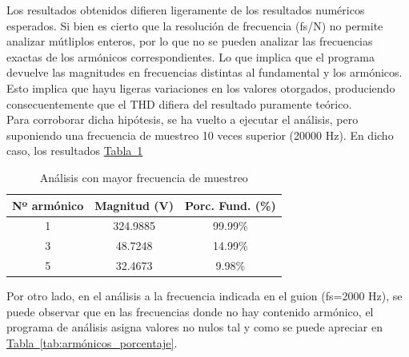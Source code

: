\documentclass{article}
\begin{document}
Los resultados obtenidos difieren ligeramente de los resultados numéricos esperados. Si bien es cierto que la resolución de frecuencia (fs/N) no permite analizar mútliplos enteros, por lo que no se pueden analizar las frecuencias exactas de los armónicos correspondientes. Lo que implica que el programa devuelve las magnitudes en frecuencias distintas al fundamental y los armónicos. Esto implica que hayu ligeras variaciones en los valores otorgados, produciendo consecuentemente que el THD difiera del resultado puramente teórico. 
\\

Para corroborar dicha hipótesis, se ha vuelto a ejecutar el análisis, pero suponiendo una frecuencia de muestreo 10 veces superior (20000 Hz). En dicho caso, los resultados \hyperref[tab:mag_harm_fs]{Tabla~\ref*{tab:mag_harm_fs}}
\\

\begin{table}[h!]
\centering
\begin{tabular}{c c c}  %
\hline
Nº armónico & Magnitud (V) & Porc. Fund. (\%) \\  %
\hline
1 & 324.9885 & 99.99\% \\
3 & 48.7248 & 14.99\% \\
5 & 32.4673 & 9.98\% \\
\hline
\end{tabular}
\caption{Análisis con mayor frecuencia de muestreo}
\label{tab:mag_harm_fs}
\end{table}

Por otro lado, en el análisis a la frecuencia indicada en el guion (fs=2000 Hz), se puede observar que en las frecuencias donde no hay contenido armónico, el programa de análisis asigna valores no nulos tal y como se puede apreciar en \hyperref[tab:armónicos_porcentaje]{Tabla~\ref*{tab:armónicos_porcentaje}}.
\\
\end{document}
